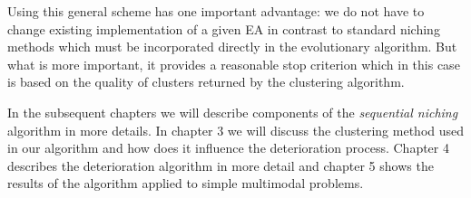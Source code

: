 Using this general scheme has one important advantage: we do not have to change
existing implementation of a given EA in contrast to standard niching
methods which must be incorporated directly in the evolutionary algorithm. But
what is more important, it provides a reasonable stop criterion which in this case is based 
on the quality of clusters returned by the clustering algorithm.
 
In the subsequent chapters we will describe components  of the
\textit{sequential niching} algorithm in more details.
In chapter 3 we will discuss the clustering method used in our algorithm and 
how does it influence the deterioration process. Chapter 4 describes the
deterioration algorithm in more detail and chapter 5 shows the results 
of the algorithm applied to simple multimodal problems.

